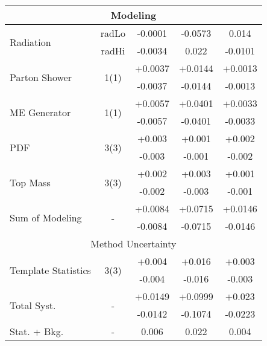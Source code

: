 \begin{table}[h!]
\begin{tabular}{lcccc}
\hline
\multicolumn{5}{c}{Modeling} \\\hline
\multirow{2}{*}{Radiation} & radLo & -0.0001 & -0.0573 & 0.014\\
                           & radHi & -0.0034 & 0.022 & -0.0101\\ \hline
\multirow{2}{*}{Parton Shower} & \multirow{2}{*}{1(1)} & +0.0037 & +0.0144 & +0.0013\\
                      &                       & -0.0037 & -0.0144 & -0.0013\\\hline
\multirow{2}{*}{ME Generator} & \multirow{2}{*}{1(1)} & +0.0057 & +0.0401 & +0.0033\\
                      &                       & -0.0057 & -0.0401 & -0.0033\\\hline
\multirow{2}{*}{PDF} & \multirow{2}{*}{3(3)} & +0.003 & +0.001 & +0.002\\
                      &                       & -0.003 & -0.001 & -0.002\\\hline
\multirow{2}{*}{Top Mass} & \multirow{2}{*}{3(3)} & +0.002 & +0.003 & +0.001\\
                      &                       & -0.002 & -0.003 & -0.001\\\hline

\hline\hline
\multirow{2}{*}{Sum of Modeling} & \multirow{2}{*}{-} & +0.0084 & +0.0715 & +0.0146\\
                      &                       & -0.0084 & -0.0715 & -0.0146\\\hline

\hline
\multicolumn{5}{c}{Method Uncertainty} \\\hline
\multirow{2}{*}{Template Statistics} & \multirow{2}{*}{3(3)} & +0.004 & +0.016 & +0.003\\
                      &                       & -0.004 & -0.016 & -0.003\\\hline

\hline\hline
\multirow{2}{*}{Total Syst.} & \multirow{2}{*}{-} & +0.0149 & +0.0999 & +0.023\\
                      &                       & -0.0142 & -0.1074 & -0.0223\\\hline
Stat. + Bkg. & - & 0.006 & 0.022 & 0.004 \\\hline

\hline\hline
\end{tabular}


\end{table}
